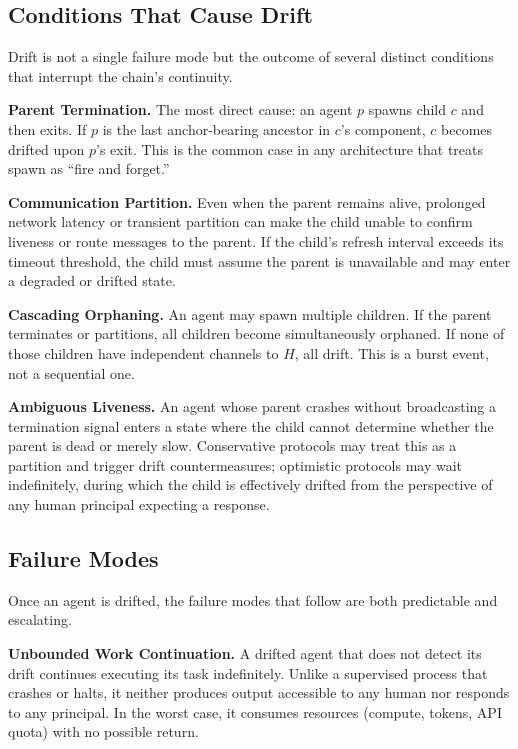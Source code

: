 \subsection{Conditions That Cause Drift}

Drift is not a single failure mode but the outcome of several distinct conditions
that interrupt the chain's continuity.

\medskip
\noindent\textbf{Parent Termination.}
The most direct cause: an agent $p$ spawns child $c$ and then exits. If $p$ is the
last anchor-bearing ancestor in $c$'s component, $c$ becomes drifted upon $p$'s
exit. This is the common case in any architecture that treats spawn as ``fire and
forget.''

\medskip
\noindent\textbf{Communication Partition.}
Even when the parent remains alive, prolonged network latency or transient partition
can make the child unable to confirm liveness or route messages to the parent.
If the child's refresh interval exceeds its timeout threshold, the child must
assume the parent is unavailable and may enter a degraded or drifted state.

\medskip
\noindent\textbf{Cascading Orphaning.}
An agent may spawn multiple children. If the parent terminates or partitions,
all children become simultaneously orphaned. If none of those children have
independent channels to $H$, all drift. This is a burst event, not a sequential one.

\medskip
\noindent\textbf{Ambiguous Liveness.}
An agent whose parent crashes without broadcasting a termination signal enters a
state where the child cannot determine whether the parent is dead or merely slow.
Conservative protocols may treat this as a partition and trigger drift countermeasures;
optimistic protocols may wait indefinitely, during which the child is effectively
drifted from the perspective of any human principal expecting a response.

\subsection{Failure Modes}

Once an agent is drifted, the failure modes that follow are both predictable and
escalating.

\medskip
\noindent\textbf{Unbounded Work Continuation.}
A drifted agent that does not detect its drift continues executing its task
indefinitely. Unlike a supervised process that crashes or halts, it neither
produces output accessible to any human nor responds to any principal.
In the worst case, it consumes resources (compute, tokens, API quota) with
no possible return.

